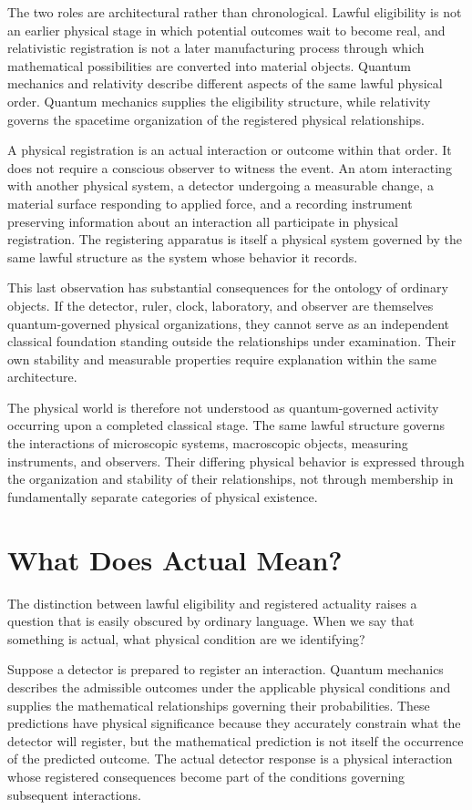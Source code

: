 \documentclass[12pt,onecolumn]{article}
\begin{document}
The two roles are architectural rather than chronological. Lawful eligibility is not an earlier physical stage in which potential outcomes wait to become real, and relativistic registration is not a later manufacturing process through which mathematical possibilities are converted into material objects. Quantum mechanics and relativity describe different aspects of the same lawful physical order. Quantum mechanics supplies the eligibility structure, while relativity governs the spacetime organization of the registered physical relationships.

A physical registration is an actual interaction or outcome within that order. It does not require a conscious observer to witness the event. An atom interacting with another physical system, a detector undergoing a measurable change, a material surface responding to applied force, and a recording instrument preserving information about an interaction all participate in physical registration. The registering apparatus is itself a physical system governed by the same lawful structure as the system whose behavior it records.

This last observation has substantial consequences for the ontology of ordinary objects. If the detector, ruler, clock, laboratory, and observer are themselves quantum-governed physical organizations, they cannot serve as an independent classical foundation standing outside the relationships under examination. Their own stability and measurable properties require explanation within the same architecture.

The physical world is therefore not understood as quantum-governed activity occurring upon a completed classical stage. The same lawful structure governs the interactions of microscopic systems, macroscopic objects, measuring instruments, and observers. Their differing physical behavior is expressed through the organization and stability of their relationships, not through membership in fundamentally separate categories of physical existence.

\section{What Does Actual Mean?}

The distinction between lawful eligibility and registered actuality raises a question that is easily obscured by ordinary language. When we say that something is actual, what physical condition are we identifying?

Suppose a detector is prepared to register an interaction. Quantum mechanics describes the admissible outcomes under the applicable physical conditions and supplies the mathematical relationships governing their probabilities. These predictions have physical significance because they accurately constrain what the detector will register, but the mathematical prediction is not itself the occurrence of the predicted outcome. The actual detector response is a physical interaction whose registered consequences become part of the conditions governing subsequent interactions.
\end{document}
